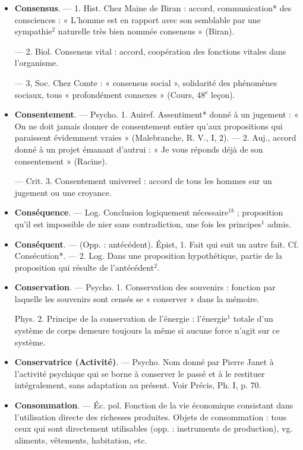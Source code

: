 \begin{itemize}[leftmargin=1cm, label=, itemsep=11pt]
\item {\bf Consensus}. — 1. Hist. Chez Maine de
Biran : accord, communication*
des consciences : « L'homme est en
rapport avec son semblable par une
sympathie$^2$ naturelle très bien
nommée consensus » (Biran).

— 2. Biol. Consensus vital : accord, coopération des fonctions vitales dans l'organisme.

— 3, Soc. Chez Comte : « consensus
social », solidarité des phénomènes
sociaux, tous « profondément connexes » (Cours, 48$^\text{e}$ leçon).

\item {\bf Consentement}. — Psycho. 1. Auiref.
Assentiment* donné à un jugement : « On ne doit jamais donner de
consentement entier qu'aux propositions qui paraissent évidemment
vraies » (Malebranche, R. V., I, 2). —
2. Auj., accord donné à un projet
émanant d'autrui : « Je vous réponds
déjà de son consentement » (Racine).

— Crit. 3. Consentement universel : accord de tous les hommes
sur un jugement ou une croyance.

\item {\bf Conséquence}. — Log. Conclusion logiquement nécessaire$^{1b}$ ; proposition
qu’il est impossible de nier sans
contradiction, une fois les principes$^1$
admis.

\item {\bf Conséquent}. — (Opp. : antécédent).
Épist, 1. Fait qui suit un autre fait.
Cf. Consécution*. — 2. Log. Dans
une proposition hypothétique, partie
de la proposition qui résulte de
l’antécédent$^2$.

\item {\bf Conservation}. — Psycho. 1. Conservation des souvenirs : fonction par
laquelle les souvenirs sont censés se
« conserver » dans la mémoire.

Phys. 2. Principe de la conservation de l’énergie : l'énergie$^1$ totale
d’un système de corps demeure toujours la même si aucune force n’agit
sur ce système.

\item {\bf Conservatrice (Activité)}. — Psycho.
Nom donné par Pierre Janet à l’activité psychique qui se borne à conserver le passé et à le restituer intégralement, sans adaptation au présent. Voir Précis, Ph. I, p. 70.

\item {\bf Consommation}. — Éc. pol. Fonction
de la vie économique consistant
dans l'utilisation directe des richesses produites. Objets de consommation : tous ceux qui sont directement utilisables (opp. : instruments
de production), vg. aliments, vêtements, habitation, etc.


\end{itemize}
